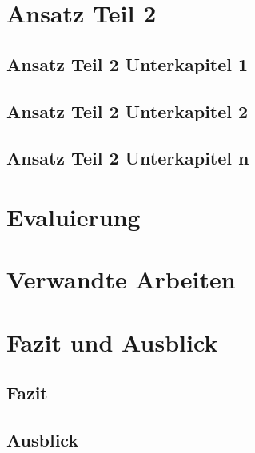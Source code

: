 \chapter{Ansatz Teil 2}\label{chp:Approach2}
  \section{Ansatz Teil 2 Unterkapitel 1}
    \blindtext
  \section{Ansatz Teil 2 Unterkapitel 2}
    \blindtext
  \section{Ansatz Teil 2 Unterkapitel n}
    \blindtext

\chapter{Evaluierung}\label{chp:Evaluation}
  \blindtext

\chapter{Verwandte Arbeiten}\label{chp:Related}
  \blindtext

\chapter{Fazit und Ausblick}\label{chp:Conclusions}
  \section{Fazit}
    \blindtext
  \section{Ausblick}
    \blindtext


\backmatter
  \tocbibliography


